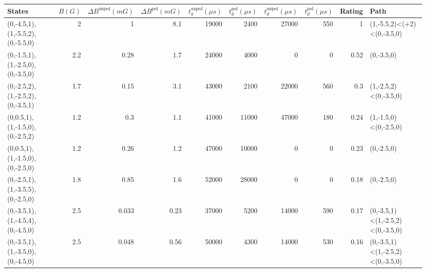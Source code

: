 \begin{tabular}{lrrrrrrrrl}
\hline
 {States}                         &   {$B(G)$} &   {$\Delta B^{\text{unpol}}(mG)$} &   {$\Delta B^{\text{pol}}(mG)$} &   {$t^{\text{unpol}}_{g}(\mu s)$} &   {$t^{\text{pol}}_{g}(\mu s)$} &   {$t^{\text{unpol}}_{d}(\mu s)$} &   {$t^{\text{pol}}_{d}(\mu s)$} &   {Rating} & {Path}                           \\
\hline
 (0,-4.5,1),(1,-5.5,2),(0,-5.5,0) &        2   &                             1     &                            8.1  &                             19000 &                            2400 &                             27000 &                             550 &       1    & (1,-5.5,2)<(+2)<(0,-3.5,0)       \\
 (0,-1.5,1),(1,-2.5,0),(0,-3.5,0) &        2.2 &                             0.28  &                            1.7  &                             24000 &                            4000 &                                 0 &                               0 &       0.52 & (0,-3.5,0)                       \\
 (0,-2.5,2),(1,-2.5,2),(0,-3.5,1) &        1.7 &                             0.15  &                            3.1  &                             43000 &                            2100 &                             22000 &                             560 &       0.3  & (1,-2.5,2)<(0,-3.5,0)            \\
 (0,0.5,1),(1,-1.5,0),(0,-2.5,2)  &        1.2 &                             0.3   &                            1.1  &                             41000 &                           11000 &                             47000 &                             180 &       0.24 & (1,-1.5,0)<(0,-2.5,0)            \\
 (0,0.5,1),(1,-1.5,0),(0,-2.5,0)  &        1.2 &                             0.26  &                            1.2  &                             47000 &                           10000 &                                 0 &                               0 &       0.23 & (0,-2.5,0)                       \\
 (0,-2.5,1),(1,-3.5,5),(0,-2.5,0) &        1.8 &                             0.85  &                            1.6  &                             52000 &                           28000 &                                 0 &                               0 &       0.18 & (0,-2.5,0)                       \\
 (0,-3.5,1),(1,-4.5,4),(0,-4.5,0) &        2.5 &                             0.033 &                            0.23 &                             37000 &                            5200 &                             14000 &                             590 &       0.17 & (0,-3.5,1)<(1,-2.5,2)<(0,-3.5,0) \\
 (0,-3.5,1),(1,-3.5,0),(0,-4.5,0) &        2.5 &                             0.048 &                            0.56 &                             50000 &                            4300 &                             14000 &                             530 &       0.16 & (0,-3.5,1)<(1,-2.5,2)<(0,-3.5,0) \\
\hline
\end{tabular}